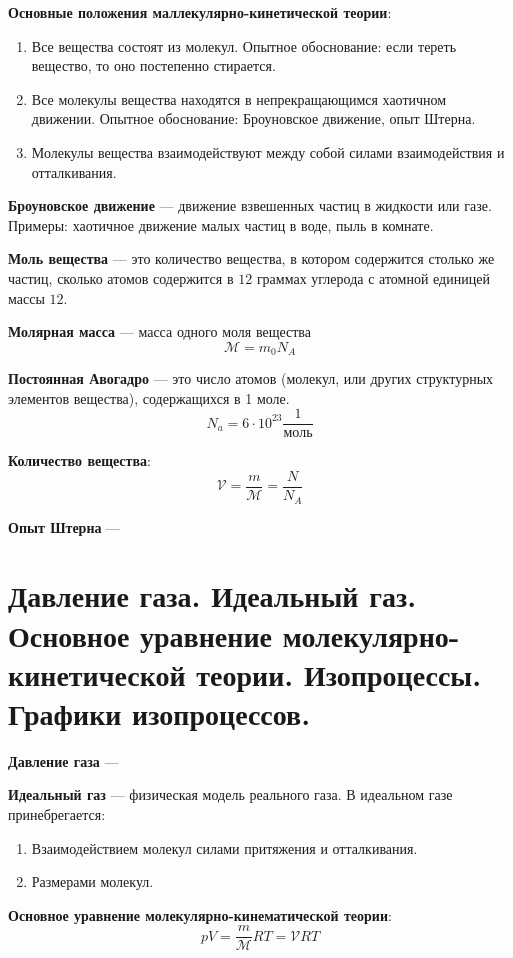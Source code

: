 \documentclass{report}
\begin{document}
{\bf Основные положения маллекулярно-кинетической теории}:
\begin{enumerate}
  \item Все вещества состоят из молекул. 
  Опытное обоснование: если тереть вещество, то оно постепенно стирается.
  \item Все молекулы вещества находятся в непрекращающимся хаотичном движении.
  Опытное обоснование: Броуновское движение, опыт Штерна.
  \item Молекулы вещества взаимодействуют между собой силами взаимодействия и отталкивания.
\end{enumerate}

{\bf Броуновское движение} ---
движение взвешенных частиц в жидкости или газе. Примеры: хаотичное движение малых частиц в воде,
пыль в комнате.

{\bf Моль вещества} ---
это количество вещества, в котором содержится столько же частиц, сколько атомов 
содержится в $12$ граммах углерода с атомной единицей массы $12$. 

{\bf Молярная масса} ---
масса одного моля вещества
$$
\mathcal{M}=m_0N_A
$$

{\bf Постоянная Авогадро} ---
это число атомов (молекул, или других структурных элементов вещества), содержащихся в 1 моле.
$$
N_a=6\cdot10^{23}\frac{1}{\textrm{моль}}
$$

{\bf Количество вещества}:
$$
\mathcal{V}=\frac{m}{\mathcal{M}}=\frac{N}{N_A}
$$

{\bf Опыт Штерна} ---



\part{Давление газа. 
Идеальный газ. 
Основное уравнение молекулярно-кинетической теории.
Изопроцессы. 
Графики изопроцессов.}

{\bf Давление газа} ---

{\bf Идеальный газ} ---
физическая модель реального газа. В идеальном газе принебрегается:
\begin{enumerate}
  \item Взаимодействием молекул силами притяжения и отталкивания.
  \item Размерами молекул.
\end{enumerate}

{\bf Основное уравнение молекулярно-кинематической теории}:
$$
pV=\frac{m}{\mathcal{M}}RT=\mathcal{V} RT
$$
\end{document}
